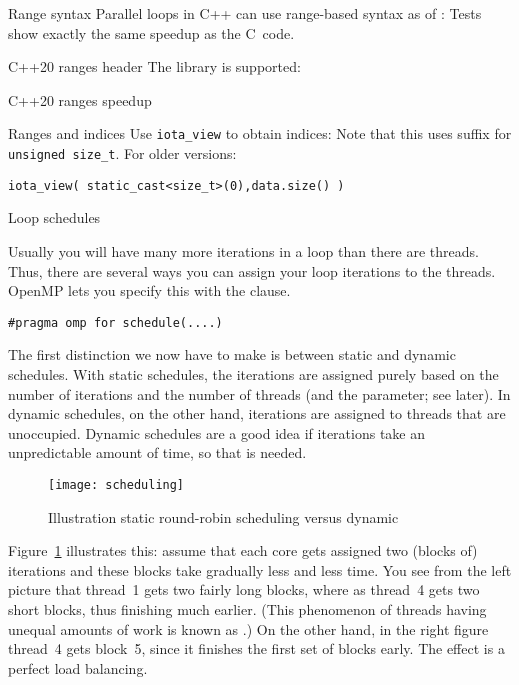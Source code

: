 \begin{cppnote}{Range syntax}
  Parallel loops in C++ can use range-based syntax as of :
  Tests show exactly the same speedup as the C~code.
\end{cppnote}

\begin{cppnote}{C++20 ranges header}
  The   library is supported:
\end{cppnote}

\begin{cppnote}{C++20 ranges speedup}
  
\end{cppnote}

\begin{cppnote}{Ranges and indices}
  Use \lstinline{iota_view} to obtain indices:
  Note that this uses  suffix for
  \lstinline{unsigned size_t}. For older versions:
\begin{lstlisting}
iota_view( static_cast<size_t>(0),data.size() )
\end{lstlisting}
\end{cppnote}

 {Loop schedules}
\label{sec:schedule}

Usually you will have many more iterations in a loop than there are threads.
Thus, there are several ways you can assign your loop iterations to the threads.
OpenMP lets you specify this with the  clause.
\begin{lstlisting}
#pragma omp for schedule(....)
\end{lstlisting}

The first distinction we now have to make is between static and dynamic schedules.
With static schedules, the iterations are assigned purely based on the number
of iterations and the number of threads (and the  parameter; see later).
In dynamic schedules, on the other hand, iterations are assigned to threads that
are unoccupied. Dynamic schedules are a good idea if iterations take an unpredictable
amount of time, so that  is needed.

\begin{figure}[ht]
  \texttt{[image: scheduling]}
  \caption{Illustration static round-robin scheduling versus dynamic}
  \label{fig:omp-robin}
\end{figure}
%
Figure~\ref{fig:omp-robin} illustrates this: assume that each core
gets assigned two (blocks of) iterations and these blocks take
gradually less and less time. You see from the left picture that
thread~1 gets two fairly long blocks, where as thread~4 gets two short
blocks, thus finishing much earlier. (This phenomenon of threads
having unequal amounts of work is known as
.)
On the other hand, in the right figure thread~4 gets
block~5, since it finishes the first set of blocks early. The effect
is a perfect load balancing.

